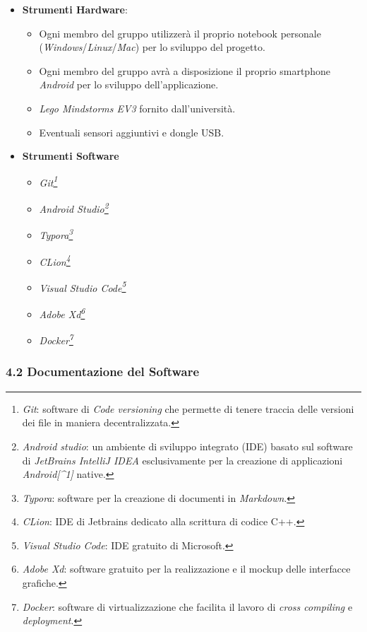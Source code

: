 \documentclass[]{article}
\providecommand{\tightlist}{%
  \setlength{\itemsep}{0pt}\setlength{\parskip}{0pt}}
\begin{document}
\begin{itemize}
\tightlist
\item
  \textbf{Strumenti Hardware}:

  \begin{itemize}
  \tightlist
  \item
    Ogni membro del gruppo utilizzerà il proprio notebook personale
    (\emph{Windows}/\emph{Linux}/\emph{Mac}) per lo sviluppo del
    progetto.
  \item
    Ogni membro del gruppo avrà a disposizione il proprio smartphone
    \emph{Android} per lo sviluppo dell'applicazione.
  \item
    \emph{Lego Mindstorms EV3} fornito dall'università.
  \item
    Eventuali sensori aggiuntivi e dongle USB.
  \end{itemize}
\item
  \textbf{Strumenti Software}

  \begin{itemize}
  \tightlist
  \item
    \emph{Git\footnote{\emph{Git}: software di \emph{Code versioning}
      che permette di tenere traccia delle versioni dei file in maniera
      decentralizzata.}}
  \item
    \emph{Android Studio\footnote{\emph{Android studio}: un ambiente di
      sviluppo integrato (IDE) basato sul software di \emph{JetBrains
      IntelliJ IDEA} esclusivamente per la creazione di applicazioni
      \emph{Android{[}\^{}1{]}} native.}}
  \item
    \emph{Typora\footnote{\emph{Typora}: software per la creazione di
      documenti in \emph{Markdown}.}}
  \item
    \emph{CLion\footnote{\emph{CLion}: IDE di Jetbrains dedicato alla
      scrittura di codice C++.}}
  \item
    \emph{Visual Studio Code\footnote{\emph{Visual Studio Code}: IDE
      gratuito di Microsoft.}}
  \item
    \emph{Adobe Xd\footnote{\emph{Adobe Xd}: software gratuito per la
      realizzazione e il mockup delle interfacce grafiche.}}
  \item
    \emph{Docker\footnote{\emph{Docker}: software di virtualizzazione
      che facilita il lavoro di \emph{cross compiling} e
      \emph{deployment}.}}
  \end{itemize}
\end{itemize}

\hypertarget{documentazione-del-software}{%
\subsubsection{4.2 Documentazione del
Software}\label{documentazione-del-software}}
\end{document}
